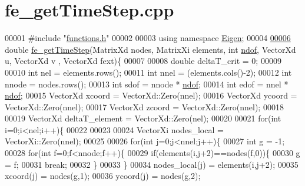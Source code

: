 \hypertarget{fe__get_time_step_8cpp_source}{}\section{fe\+\_\+get\+Time\+Step.\+cpp}
\label{fe__get_time_step_8cpp_source}

\begin{DoxyCode}
00001 \textcolor{preprocessor}{#include "\hyperlink{functions_8h}{functions.h}"}
00002 
00003 \textcolor{keyword}{using namespace }\hyperlink{namespace_eigen}{Eigen};
00004 
\hyperlink{fe__get_time_step_8cpp_a537640b537f4b485607b062f2c25d974}{00006} \textcolor{keywordtype}{double} \hyperlink{fe__get_time_step_8cpp_a537640b537f4b485607b062f2c25d974}{fe\_getTimeStep}(MatrixXd nodes, MatrixXi elements, \textcolor{keywordtype}{int} \hyperlink{_global_variables_8h_aa789fe4d8a13fd0990b630909430d5d0}{ndof}, VectorXd u, VectorXd v
      , VectorXd fext)\{
00007 
00008     \textcolor{keywordtype}{double} deltaT\_crit = 0;
00009 
00010     \textcolor{keywordtype}{int} nel = elements.rows();
00011     \textcolor{keywordtype}{int} nnel = (elements.cols()-2);
00012     \textcolor{keywordtype}{int} nnode = nodes.rows();
00013     \textcolor{keywordtype}{int} sdof = nnode * \hyperlink{_global_variables_8h_aa789fe4d8a13fd0990b630909430d5d0}{ndof};
00014     \textcolor{keywordtype}{int} edof = nnel * \hyperlink{_global_variables_8h_aa789fe4d8a13fd0990b630909430d5d0}{ndof};
00015     VectorXd xcoord = VectorXd::Zero(nnel);
00016     VectorXd ycoord = VectorXd::Zero(nnel);
00017     VectorXd zcoord = VectorXd::Zero(nnel);
00018 
00019     VectorXd deltaT\_element = VectorXd::Zero(nel);
00020 
00021     \textcolor{keywordflow}{for}(\textcolor{keywordtype}{int} i=0;i<nel;i++)\{
00022 
00023 
00024         VectorXi nodes\_local = VectorXi::Zero(nnel);
00025 
00026         \textcolor{keywordflow}{for}(\textcolor{keywordtype}{int} j=0;j<nnel;j++)\{
00027             \textcolor{keywordtype}{int} g = -1;
00028             \textcolor{keywordflow}{for}(\textcolor{keywordtype}{int} f=0;f<nnode;f++)\{
00029                 \textcolor{keywordflow}{if}(elements(i,j+2)==nodes(f,0))\{
00030                     g = f;
00031                     \textcolor{keywordflow}{break};
00032                 \}
00033             \}
00034             nodes\_local(j) = elements(i,j+2);
00035             xcoord(j) = nodes(g,1);
00036             ycoord(j) = nodes(g,2);

\end{DoxyCode}
